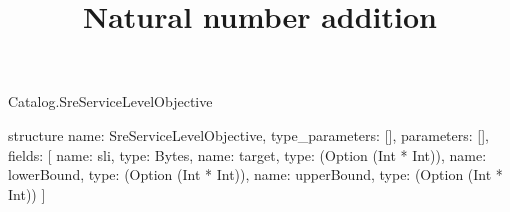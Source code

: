 \begin{lexlean}{Catalog.SreServiceLevelObjective}
\title{Natural number addition}
\begin{semanticmodule}
structure{
  name: SreServiceLevelObjective,
  type_parameters: [],
  parameters: [],
  fields: [
    {name: sli, type: Bytes},
    {name: target, type: (Option (Int * Int))},
    {name: lowerBound, type: (Option (Int * Int))},
    {name: upperBound, type: (Option (Int * Int))}
  ]
}
\end{semanticmodule}
\end{lexlean}
